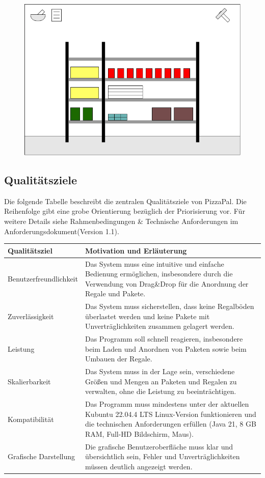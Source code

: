 \begin{figure}[H]
    \includegraphics[width=\linewidth]{./images/einfuehrung/GUI-Skizze.png}
    \label{fig:GUIbeispiel}
\end{figure}

\newpage
\subsection{Qualitätsziele}
Die folgende Tabelle beschreibt die zentralen Qualitätsziele von PizzaPal. Die Reihenfolge gibt eine grobe Orientierung bezüglich der Priorisierung vor. Für weitere Details siehe Rahmenbedingungen \& Technische Anforderungen im Anforderungsdokument(Version 1.1).

\begin{longtable}{|m{}|m{}|}
    \hline
    \textbf{Qualitätsziel} & \textbf{Motivation und Erläuterung} \\
    \hline
    Benutzerfreundlichkeit & Das System muss eine intuitive und einfache Bedienung ermöglichen, insbesondere durch die Verwendung von Drag\&Drop für die Anordnung der Regale und Pakete. \\
    \hline
    Zuverlässigkeit & Das System muss sicherstellen, dass keine Regalböden überlastet werden und keine Pakete mit Unverträglichkeiten zusammen gelagert werden. \\
    \hline
    Leistung & Das Programm soll schnell reagieren, insbesondere beim Laden und Anordnen von Paketen sowie beim Umbauen der Regale. \\
    \hline
    Skalierbarkeit & Das System muss in der Lage sein, verschiedene Größen und Mengen an Paketen und Regalen zu verwalten, ohne die Leistung zu beeinträchtigen. \\
    \hline
    Kompatibilität & Das Programm muss mindestens unter der aktuellen Kubuntu 22.04.4 LTS Linux-Version funktionieren und die technischen Anforderungen erfüllen (Java 21, 8 GB RAM, Full-HD Bildschirm, Maus). \\
    \hline
    Grafische Darstellung & Die grafische Benutzeroberfläche muss klar und übersichtlich sein, Fehler und Unverträglichkeiten müssen deutlich angezeigt werden. \\
    \hline
\end{longtable}

